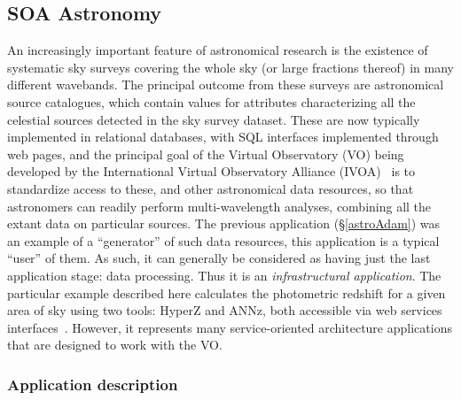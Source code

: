 \subsection{SOA Astronomy \label{astroSOAAdam}}

%



An increasingly important feature of astronomical research is the
existence of systematic sky surveys covering the whole sky (or large
fractions thereof) in many different wavebands. The principal outcome
from these surveys are astronomical source catalogues, which contain
values for attributes characterizing all the celestial sources
detected in the sky survey dataset.  These are now typically
implemented in relational databases, with SQL interfaces implemented
through web pages, and the principal goal of the Virtual Observatory
(VO) being developed by the International Virtual Observatory Alliance
(IVOA)~\cite{ivoa} is to standardize access to these, and other
astronomical data resources, so that astronomers can readily perform
multi-wavelength analyses, combining all the extant data on particular
sources.  The previous application (\S\ref{astroAdam}) was an example
of a ``generator'' of such data resources, this application is a
typical ``user'' of them.  As such, it can generally be considered as
having just the last application stage: data processing.  Thus it is
an {\em infrastructural application}.  The particular example
described here calculates the photometric redshift for a given area of
sky using two tools: HyperZ and ANNz, both accessible via web services
interfaces~\cite{barker}.  However, it represents many
service-oriented architecture applications that are designed to work
with the VO.

\subsubsection*{Application description}



